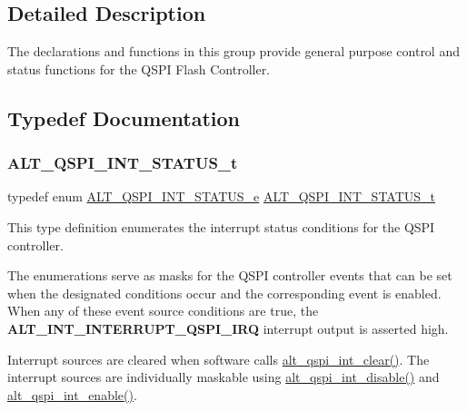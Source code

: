 \subsection{Detailed Description}
The declarations and functions in this group provide general purpose control and status functions for the Q\+S\+PI Flash Controller. 

\subsection{Typedef Documentation}
\mbox{\label{group__ALT__QSPI__CSR_ga9630d0374a96983752d4053c122665dd}} 
\subsubsection{\texorpdfstring{ALT\_QSPI\_INT\_STATUS\_t}{ALT\_QSPI\_INT\_STATUS\_t}}
{\footnotesize\ttfamily typedef enum \mbox{\hyperlink{group__ALT__QSPI__CSR_ga919562dd181acc42914bea253e31fae1}{A\+L\+T\+\_\+\+Q\+S\+P\+I\+\_\+\+I\+N\+T\+\_\+\+S\+T\+A\+T\+U\+S\+\_\+e}}  \mbox{\hyperlink{group__ALT__QSPI__CSR_ga9630d0374a96983752d4053c122665dd}{A\+L\+T\+\_\+\+Q\+S\+P\+I\+\_\+\+I\+N\+T\+\_\+\+S\+T\+A\+T\+U\+S\+\_\+t}}}

This type definition enumerates the interrupt status conditions for the Q\+S\+PI controller.

The enumerations serve as masks for the Q\+S\+PI controller events that can be set when the designated conditions occur and the corresponding event is enabled. When any of these event source conditions are true, the {\bfseries{A\+L\+T\+\_\+\+I\+N\+T\+\_\+\+I\+N\+T\+E\+R\+R\+U\+P\+T\+\_\+\+Q\+S\+P\+I\+\_\+\+I\+RQ}} interrupt output is asserted high.

Interrupt sources are cleared when software calls \mbox{\hyperlink{group__ALT__QSPI__CSR_gaf436f88abd8e2af796cc070792db5168}{alt\+\_\+qspi\+\_\+int\+\_\+clear()}}. The interrupt sources are individually maskable using \mbox{\hyperlink{group__ALT__QSPI__CSR_gabafd6da28abc48578f144cbd6c85e224}{alt\+\_\+qspi\+\_\+int\+\_\+disable()}} and \mbox{\hyperlink{group__ALT__QSPI__CSR_ga90573895220218be5c3be1888010e5bc}{alt\+\_\+qspi\+\_\+int\+\_\+enable()}}. 

